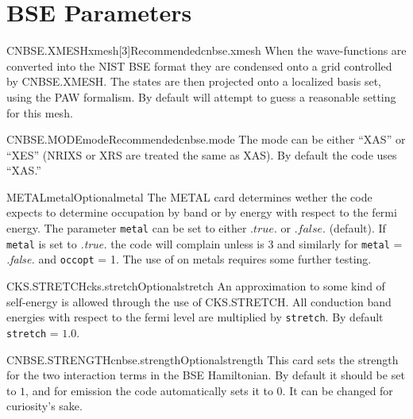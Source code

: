 \documentclass[11pt]{report}
\begin{document}
\section{BSE Parameters}
\label{sec:BSE-Parameters}

\begin{Card}{CNBSE.XMESH}{xmesh[3]}{Recommended}{cnbse.xmesh}
When the wave-functions are converted into the NIST BSE format they are condensed onto a grid controlled by CNBSE.XMESH. The states are then projected onto a localized basis set, using the PAW formalism. By default  will attempt to guess a reasonable 
setting for this mesh. 
\end{Card}

\begin{Card}{CNBSE.MODE}{mode}{Recommended}{cnbse.mode}
The mode can be either ``XAS'' or ``XES'' (NRIXS or XRS are treated the same as XAS). By default the code uses ``XAS.''
\end{Card}

\begin{Card}{METAL}{metal}{Optional}{metal}
The METAL card determines wether the code expects to determine occupation by band or by energy with respect to the fermi energy. The parameter \texttt{metal} can be set to either $.true.$ or $.false.$ (default). If \texttt{metal} is set to {\it .true.} the code will complain unless  is 3 and similarly for \texttt{metal} = {\it .false.} and \texttt{occopt} = 1. The use of  on metals requires some further testing. 
\end{Card}

\begin{Card}{CKS.STRETCH}{cks.stretch}{Optional}{stretch}
An approximation to some kind of self-energy is allowed through the use of CKS.STRETCH. All conduction band energies with respect to the fermi level are multiplied by \texttt{stretch}. By default \texttt{stretch} = $1.0$. 
\end{Card}

\begin{Card}{CNBSE.STRENGTH}{cnbse.strength}{Optional}{strength}
This card sets the strength for the two interaction terms in the BSE Hamiltonian. By default it should be set to $1$, and for emission the code automatically sets it to $0$. 
It can be changed for curiosity's sake.
\end{Card}

\end{document}
